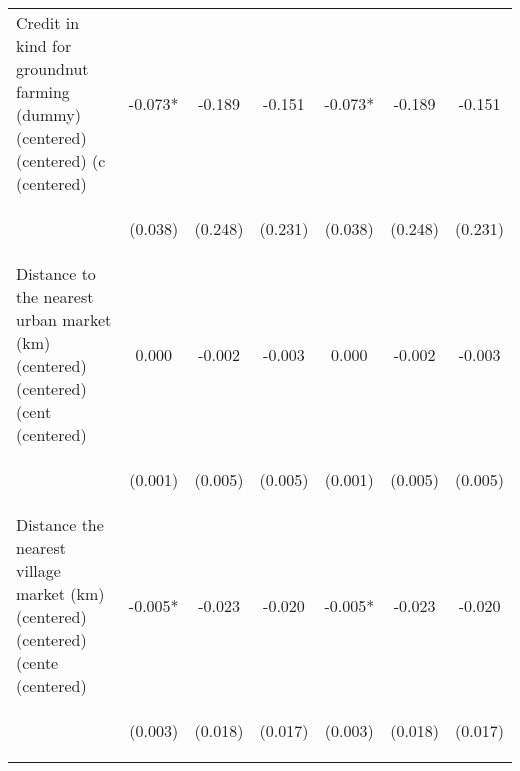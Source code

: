 \begin{center}
\begin{tabular}{lcccccc}
Credit in kind for groundnut farming (dummy) (centered) (centered) (c (centered) & -0.073* & -0.189 & -0.151 & -0.073* & -0.189 & -0.151 \\
\vspace{4pt} & \begin{footnotesize}(0.038)\end{footnotesize} & \begin{footnotesize}(0.248)\end{footnotesize} & \begin{footnotesize}(0.231)\end{footnotesize} & \begin{footnotesize}(0.038)\end{footnotesize} & \begin{footnotesize}(0.248)\end{footnotesize} & \begin{footnotesize}(0.231)\end{footnotesize} \\
Distance to the nearest urban market (km) (centered) (centered) (cent (centered) & 0.000 & -0.002 & -0.003 & 0.000 & -0.002 & -0.003 \\
\vspace{4pt} & \begin{footnotesize}(0.001)\end{footnotesize} & \begin{footnotesize}(0.005)\end{footnotesize} & \begin{footnotesize}(0.005)\end{footnotesize} & \begin{footnotesize}(0.001)\end{footnotesize} & \begin{footnotesize}(0.005)\end{footnotesize} & \begin{footnotesize}(0.005)\end{footnotesize} \\
Distance the nearest village market (km) (centered) (centered) (cente (centered) & -0.005* & -0.023 & -0.020 & -0.005* & -0.023 & -0.020 \\
\vspace{4pt} & \begin{footnotesize}(0.003)\end{footnotesize} & \begin{footnotesize}(0.018)\end{footnotesize} & \begin{footnotesize}(0.017)\end{footnotesize} & \begin{footnotesize}(0.003)\end{footnotesize} & \begin{footnotesize}(0.018)\end{footnotesize} & \begin{footnotesize}(0.017)\end{footnotesize} \\

\end{tabular}
\end{center}
